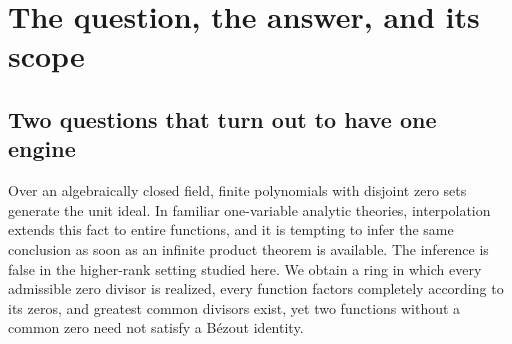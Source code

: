 \documentclass[11pt]{article}
\theoremstyle{plain}
\theoremstyle{plain}
\theoremstyle{plain}
\theoremstyle{definition}
\theoremstyle{definition}
\theoremstyle{definition}
\theoremstyle{definition}
\theoremstyle{remark}
\begin{document}
\begin{abstract}
This report is the union of eight manuscripts. Two were written
independently and proved the same engine; a third, written against their
merge, answered the question about the interpolation image that the merge
had left open; a fourth, written in parallel against a snapshot in which
that question was still open, proved the same image theorem independently by
a different construction and
added the ideal-theoretic refinements above; a fifth answered the
scalar-extension clause of the several-variable question; a sixth described
the prime ideals above a product with one simple node per shell; a seventh
proved the rectification dichotomy and the fat-point ideals in several
variables; an eighth proved the arithmetic-sampling, flatness,
exceptional-ideal and computability results at ordinary points. The
arbitrary-rank
classifications, the explicit non-B\'ezout construction, the exact shellwise
image and its ideal theory, the universal extension domain and its
several-variable replacement, the analytic prime fibres with their
splitting under cofinal extension, the rectification dichotomy with its
reduction obstruction and fat-point ideals, and the coefficientwise division,
faithful flatness, arithmetic sampling, exceptional ideals and halting barrier
at ordinary points are proposed original
contributions, not a
claimed solution of any named published conjecture. Classical Hahn-field
inputs and rank-one antecedents are identified and credited, and so is the
classical ultraproduct and valuation-domain mechanism behind the prime
fibres. Complete proofs
are supplied; they have not been independently refereed or verified in a
proof assistant.
\end{abstract}
\newpage
\tableofcontents
\newpage

\section{The question, the answer, and its scope}
\label{ent:sec:intro}

\subsection{Two questions that turn out to have one engine}
Over an algebraically closed field, finite polynomials with disjoint zero
sets generate the unit ideal. In familiar one-variable analytic theories,
interpolation extends this fact to entire functions, and it is tempting to
infer the same conclusion as soon as an infinite product theorem is
available. The inference is false in the higher-rank setting studied here.
We obtain a ring in which every admissible zero divisor is realized, every
function factors completely according to its zeros, and greatest common
divisors exist, yet two functions without a common zero need not satisfy a
B\'ezout identity.
\end{document}
